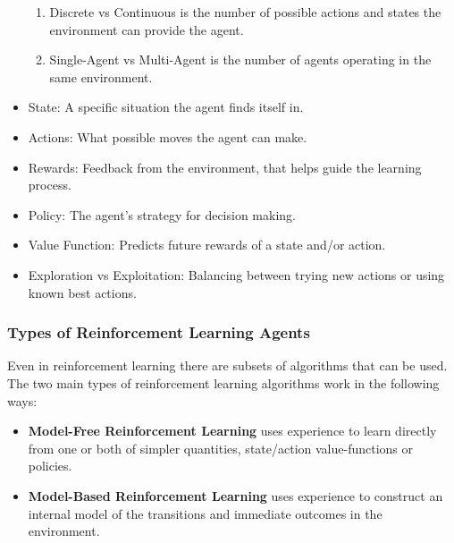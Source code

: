 \begin{itemize}
\begin{enumerate}
                  \item Discrete vs Continuous is the number of possible actions and states the environment can provide the agent.
                  \item Single-Agent vs Multi-Agent is the number of agents operating in the same environment.
            \end{enumerate}
      \item State: A specific situation the agent finds itself in.
      \item Actions: What possible moves the agent can make.
      \item Rewards: Feedback from the environment, that helps guide the learning process.
      \item Policy: The agent's strategy for decision making.
      \item Value Function: Predicts future rewards of a state and/or action.
      \item Exploration vs Exploitation: Balancing between trying new actions or using known best actions.
\end{itemize}


\subsubsection{Types of Reinforcement Learning Agents}
Even in reinforcement learning there are subsets of algorithms that can be used. The two main types of reinforcement learning algorithms work in the following ways:
\begin{itemize}
      \item \textbf{Model-Free Reinforcement Learning} uses experience to learn directly from one or both of simpler quantities, state/action value-functions or policies. %
      \item \textbf{Model-Based Reinforcement Learning} uses experience to construct an internal model of the transitions and immediate outcomes in the environment.
\end{itemize}

